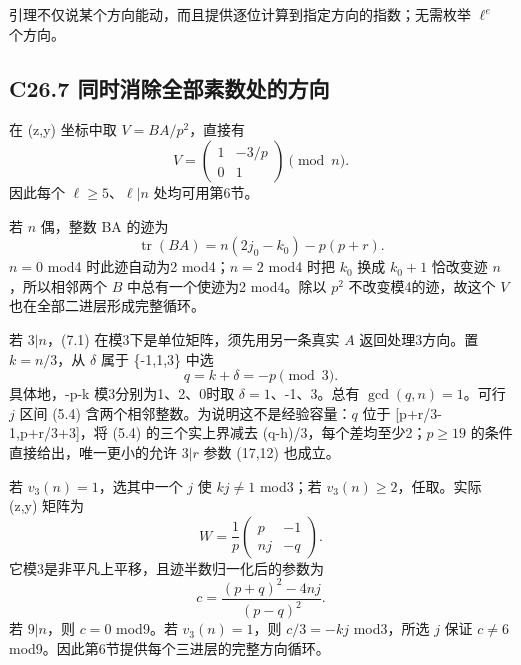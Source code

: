 \documentclass[11pt,a4paper]{article}
\theoremstyle{definition}
\numberwithin{equation}{section}
\begin{document}
{引理不仅说某个方向能动，而且提供逐位计算到指定方向的指数；无需枚举} {\ensuremath{\ell ^{e}}} {个方向。}

\subsection*{\texorpdfstring{{C26.7} {同时消除全部素数处的方向}}{C26.7 同时消除全部素数处的方向}}\label{C26-h165}

{在} {(z,y)} {坐标中取} {\ensuremath{V=BA/p^{2}}，直接有} \[
V=\begin{pmatrix}1&-3/p\\0&1\end{pmatrix}\pmod n.
\tag{C26.7.1}
\] {因此每个} {\ensuremath{\ell \ge 5}、\ensuremath{\ell |n}} {处均可用第6节。}

{若} {\ensuremath{n}} {偶，整数} {BA} {的迹为} \[
\operatorname{tr}(BA)=n(2j_0-k_0)-p(p+r).
\tag{C26.7.2}
\] {\ensuremath{n=0}} {mod4} {时此迹自动为2} {mod4；\ensuremath{n=2}} {mod4} {时把} {\ensuremath{k_{0}}} {换成} {\ensuremath{k_{0}+1}} {恰改变迹} {\ensuremath{n}，所以相邻两个} {\ensuremath{B}} {中总有一个使迹为2} {mod4。除以} {\ensuremath{p^{2}}} {不改变模4的迹，故这个} {\ensuremath{V}} {也在全部二进层形成完整循环。}

{若} {\ensuremath{3|n}，(7.1)} {在模3下是单位矩阵，须先用另一条真实} {\ensuremath{A}} {返回处理3方向。置} {\ensuremath{k=n/3}，从} {\ensuremath{\delta }} {属于} {\{-1,1,3\}} {中选} \[
q=k+\delta=-p\pmod3.
\] {具体地，-p-k} {模3分别为1、2、0时取} {\ensuremath{\delta =1}、-1、3。总有} {\ensuremath{\operatorname{gcd}(q,n)=1}。可行} {\ensuremath{j}} {区间} {(5.4)} {含两个相邻整数。为说明这不是经验容量：\ensuremath{q}} {位于} {{[}p+r/3-1,p+r/3+3{]}，将} {(5.4)} {的三个实上界减去} {(q-h)/3，每个差均至少2；\ensuremath{p\ge 19}} {的条件直接给出，唯一更小的允许} {\ensuremath{3|r}} {参数} {(17,12)} {也成立。}

{若} {\ensuremath{v_{3}(n)=1}，选其中一个} {\ensuremath{j}} {使} {\ensuremath{kj\ne 1}} {mod3；若} {\ensuremath{v_{3}(n)\ge 2}，任取。实际} {(z,y)} {矩阵为} \[
W=\frac1p\begin{pmatrix}p&-1\\nj&-q\end{pmatrix}.
\] {它模3是非平凡上平移，且迹半数归一化后的参数为} \[
c=\frac{(p+q)^2-4nj}{(p-q)^2}.
\tag{C26.7.3}
\] {若} {\ensuremath{9|n}，则} {\ensuremath{c=0}} {mod9。若} {\ensuremath{v_{3}(n)=1}，则} {\ensuremath{c/3=-kj}} {mod3，所选} {\ensuremath{j}} {保证} {\ensuremath{c\ne 6}} {mod9。因此第6节提供每个三进层的完整方向循环。}
\end{document}
